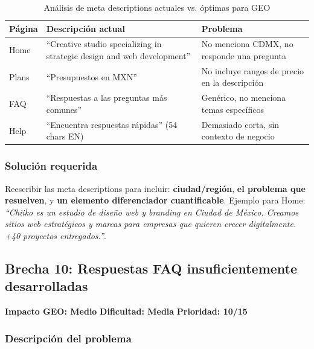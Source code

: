 \documentclass[12pt, a4paper]{article}
\begin{document}
\begin{table}[H]
\centering
{}
\begin{tabularx}{\textwidth}{L{2cm} L{5cm} L{6cm}}
  \toprule
  \textbf{Página} & \textbf{Descripción actual} & \textbf{Problema} \\
  \midrule
  Home & ``Creative studio specializing in strategic design and web development'' & No menciona CDMX, no responde una pregunta \\
  Plans & ``Presupuestos en MXN'' & No incluye rangos de precio en la descripción \\
  FAQ & ``Respuestas a las preguntas más comunes'' & Genérico, no menciona temas específicos \\
  Help & ``Encuentra respuestas rápidas'' (54 chars EN) & Demasiado corta, sin contexto de negocio \\
  \bottomrule
\end{tabularx}
\caption{Análisis de meta descriptions actuales vs. óptimas para GEO}
\end{table}

\subsubsection{Solución requerida}

Reescribir las meta descriptions para incluir: \textbf{ciudad/región}, \textbf{el problema que resuelven}, y \textbf{un elemento diferenciador cuantificable}. Ejemplo para Home: \textit{``Chiiko es un estudio de diseño web y branding en Ciudad de México. Creamos sitios web estratégicos y marcas para empresas que quieren crecer digitalmente. +40 proyectos entregados.''}.

\subsection{Brecha 10: Respuestas FAQ insuficientemente desarrolladas}

\begin{medbox}
\textbf{Impacto GEO: Medio} \quad \textbf{Dificultad: Media} \quad \textbf{Prioridad: 10/15}
\end{medbox}

\subsubsection{Descripción del problema}
\end{document}
